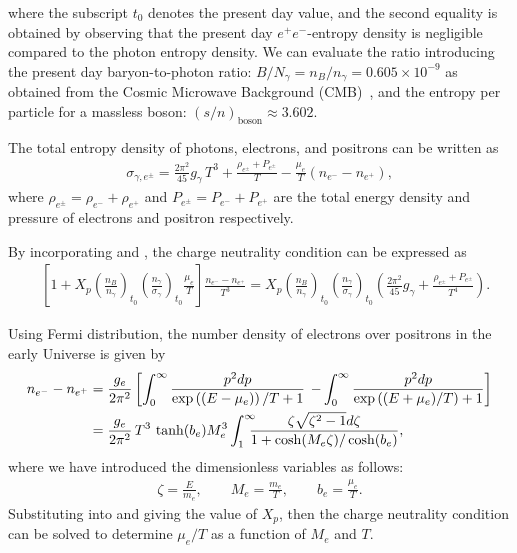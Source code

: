 where the subscript $t_0$ denotes the present day value, and the second equality is obtained by observing that the present day $e^+e^-$-entropy density is negligible compared to the photon entropy density. We can evaluate the ratio introducing the present day baryon-to-photon ratio: $B/N_\gamma =n_B/n_\gamma= 0.605\times10^{-9}$ as obtained from the Cosmic Microwave Background (CMB)~\cite{ParticleDataGroup:2022pth}, and the entropy per particle for a massless boson: $(s/n)_{\mathrm{boson}}\approx 3.602$.

The total entropy density of photons, electrons, and positrons can be written as
\begin{align}\label{entropy_per_baryon}
\sigma_{\gamma,e^\pm}=\frac{2\pi^2}{45}g_\gamma\,T^3+\frac{\rho_{e^\pm}+P_{e^\pm}}{T}-\frac{\mu_e}{T}(n_{e^-}-n_{{e^+}}),
 \end{align}
where $ \rho_{e^\pm}=\rho_{e^-}+\rho_{e^+}$ and $P_{e^\pm}=P_{e^-}+P_{{e^+}}$ are the total energy density and pressure of electrons and positron respectively.

By incorporating  and , the charge neutrality condition can be expressed as
\begin{align}\label{charge_neutral_cond3}
 &\left[1+X_p\left(\frac{n_B}{n_\gamma}\right)_{\!t_0}\!\!\left(\frac{n_\gamma}{\sigma_{\gamma}}\right)_{\!t_0}\!\!\frac{\mu_e}{T}\right]\frac{n_{e^-}-n_{{e^+}}}{T^3}=X_p\left(\frac{n_B}{n_\gamma}\right)_{\!t_0}\!\!\left(\frac{n_\gamma}{\sigma_{\gamma}}\right)_{\!t_0}\!\!\left(\frac{2\pi^2}{45}g_\gamma+\frac{\rho_{e^\pm}+P_{e^\pm}}{T^4}\right).
\end{align}

Using Fermi distribution, the number density of electrons over positrons in the early Universe is given by
\begin{align}\label{ee_density}
n_{e^-}-n_{{e^+}}&=\frac{g_e}{2\pi^2}\left[\int_0^\infty\frac{p^2dp}{\exp{\left((E-\mu_e)\right)/T}+1}\right.\left.-\int_0^\infty\frac{p^2dp}{\exp{\left((E+\mu_e)/T\right)}+1}\right]\notag\\
&=\frac{g_e}{2\pi^2}\,{T^3}\,\tanh(b_e)M_e^3\int_{1}^\infty \!\!\!\!\frac{ \zeta \sqrt{\zeta^2-1} d\zeta}{1+\cosh(M_e\zeta)/\cosh(b_e)},
\end{align}
where we have introduced the dimensionless variables as follows: 
\begin{align}\label{Variables}
\zeta=\frac{E}{m_e},\qquad M_e=\frac{m_e}{T},\qquad b_e=\frac{\mu_e}{T}.
\end{align}
Substituting  into  and giving the value of $X_p$, then the charge neutrality condition can be solved to determine $\mu_e/T$ as a function of $M_e$ and $T$. 

